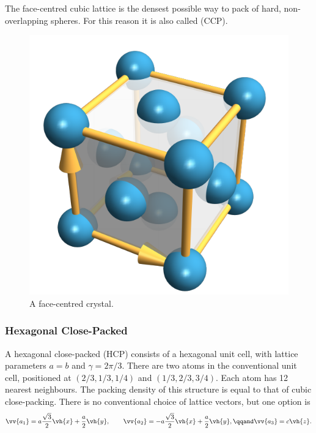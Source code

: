 \documentclass[fleqn]{NotesClass}
\begin{document}
    The face-centred cubic lattice is the densest possible way to pack of hard, non-overlapping spheres.
    For this reason it is also called  (CCP).
    
    \begin{figure}
        \includegraphics{images/fcc-crystal.pdf}
        \caption{A face-centred crystal.}
    \end{figure}
    
    \subsubsection{Hexagonal Close-Packed}
    A hexagonal close-packed (HCP) consists of a hexagonal unit cell, with lattice parameters \(a = b\) and \(\gamma = 2\pi/3\).
    There are two atoms in the conventional unit cell, positioned at \((2/3,1/3,1/4)\) and \((1/3,2/3,3/4)\).
    Each atom has 12 nearest neighbours.
    The packing density of this structure is equal to that of cubic close-packing.
    There is no conventional choice of lattice vectors, but one option is
    \begin{equation}
        \vv{a_1} = a\frac{\sqrt{3}}{2}\vh{x} + \frac{a}{2}\vh{y}, \qquad \vv{a_2} = -a\frac{\sqrt{3}}{2}\vh{x} + \frac{a}{2}\vh{y}, \qqand \vv{a_3} = c\vh{z}.
    \end{equation}
\end{document}
